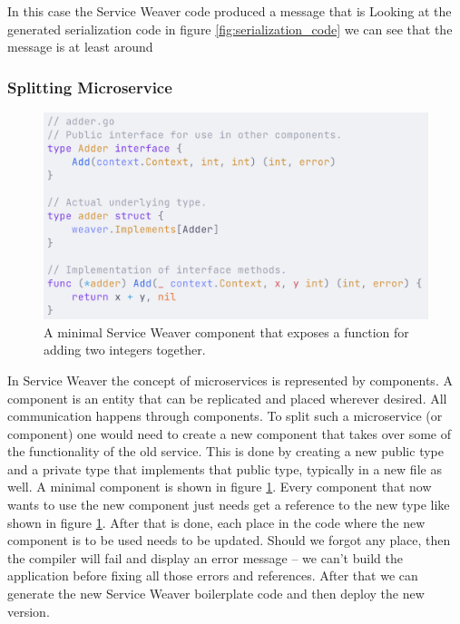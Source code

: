 \documentclass[sigconf,review,9pt]{acmart}
\begin{document}
In this case the Service Weaver code produced a message that is
Looking at the generated serialization code in figure \ref{fig:serialization_code}
we can see that the message is at least around

\subsubsection{Splitting Microservice}

\begin{figure}
	\includegraphics[width=\columnwidth]{minimal_component}
	\caption{A minimal Service Weaver component that exposes a function
		for adding two integers together.}
	\label{fig:minimal_component}
\end{figure}

In Service Weaver the concept of microservices is represented by components.
A component is an entity that can be replicated and placed wherever desired.
All communication happens through components.
To split such a microservice (or component) one would need to create a new
component that takes over some of the functionality of the old service.
This is done by creating a new public type and a private type that implements
that public type, typically in a new file as well.
A minimal component is shown in figure \ref{fig:minimal_component}.
Every component that now wants to use the new component just needs get a reference
to the new type like shown in figure \ref{fig:minimal_component}.
After that is done, each place in the code where the new component is to be used
needs to be updated.
Should we forgot any place, then the compiler will fail and display an error message
-- we can't build the application before fixing all those errors and references.
After that we can generate the new Service Weaver boilerplate code and then deploy
the new version.
\end{document}
